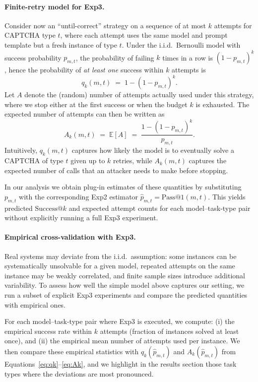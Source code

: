 \documentclass[sigconf, review]{acmart}
\begin{document}
\paragraph{Finite-retry model for Exp3.}
Consider now an ``until-correct'' strategy on a sequence of at most $k$ attempts for CAPTCHA type $t$, where each attempt uses the same model and prompt template but a fresh instance of type $t$. Under the i.i.d.\ Bernoulli model with success probability $p_{m,t}$, the probability of failing $k$ times in a row is $(1-p_{m,t})^k$, hence the probability of \emph{at least one} success within $k$ attempts is
\begin{equation}
  q_k(m,t)
  \;=\;
  1 - (1 - p_{m,t})^k.
  \label{eq:qk}
\end{equation}
Let $A$ denote the (random) number of attempts actually used under this strategy, where we stop either at the first success or when the budget $k$ is exhausted.
The expected number of attempts can then be written as
\begin{equation}
  A_k(m,t)
  \;=\;
  \mathbb{E}[A]
  \;=\;
  \frac{1 - (1 - p_{m,t})^k}{p_{m,t}}.
  \label{eq:Ak}
\end{equation}
Intuitively, $q_k(m,t)$ captures how likely the model is to eventually solve a CAPTCHA of type $t$ given up to $k$ retries, while $A_k(m,t)$ captures the expected number of calls that an attacker needs to make before stopping.

In our analysis we obtain plug-in estimates of these quantities by substituting $p_{m,t}$ with the corresponding Exp2 estimator $\hat p_{m,t}=\mathrm{Pass@1}(m,t)$.
This yields predicted $\mathrm{Success@}k$ and expected attempt counts for each model--task-type pair without explicitly running a full Exp3 experiment.

\paragraph{Empirical cross-validation with Exp3.}
Real systems may deviate from the i.i.d.\ assumption: some instances can be systematically unsolvable for a given model, repeated attempts on the same instance may be weakly correlated, and finite sample sizes introduce additional variability.
To assess how well the simple model above captures our setting, we run a subset of explicit Exp3 experiments and compare the predicted quantities with empirical ones.

For each model--task-type pair where Exp3 is executed, we compute:
(i) the empirical success rate within $k$ attempts (fraction of instances solved at least once), and
(ii) the empirical mean number of attempts used per instance.
We then compare these empirical statistics with $q_k(\hat p_{m,t})$ and $A_k(\hat p_{m,t})$ from Equations~\eqref{eq:qk}--\eqref{eq:Ak}, and we highlight in the results section those task types where the deviations are most pronounced.
\end{document}
